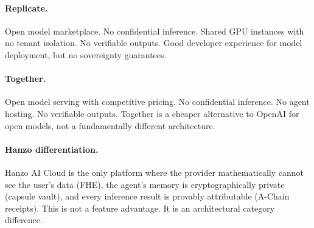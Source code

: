\paragraph{Replicate.} Open model marketplace. No confidential inference.
Shared GPU instances with no tenant isolation. No verifiable outputs. Good
developer experience for model deployment, but no sovereignty guarantees.

\paragraph{Together.} Open model serving with competitive pricing. No
confidential inference. No agent hosting. No verifiable outputs. Together
is a cheaper alternative to OpenAI for open models, not a fundamentally
different architecture.

\paragraph{Hanzo differentiation.} Hanzo AI Cloud is the only platform where
the provider mathematically cannot see the user's data (FHE), the agent's
memory is cryptographically private (capsule vault), and every inference result
is provably attributable (A-Chain receipts). This is not a feature advantage.
It is an architectural category difference.

